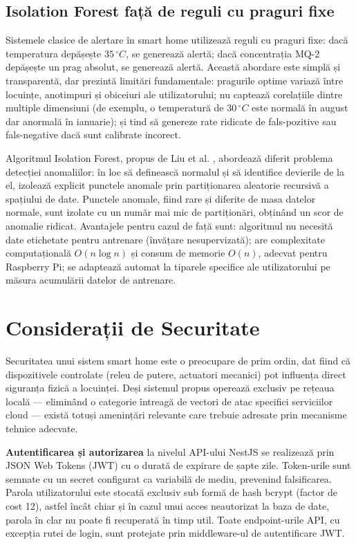 \documentclass[12pt, twoside, a4paper]{report}
\begin{document}
\subsection{Isolation Forest față de reguli cu praguri fixe}

Sistemele clasice de alertare în smart home utilizează reguli cu praguri fixe: dacă
temperatura depășește $35\,^{\circ}C$, se generează alertă; dacă concentrația MQ-2
depășește un prag absolut, se generează alertă. Această abordare este simplă și
transparentă, dar prezintă limitări fundamentale: pragurile optime variază între locuințe,
anotimpuri și obiceiuri ale utilizatorului; nu captează corelațiile dintre multiple
dimensiuni (de exemplu, o temperatură de $30\,^{\circ}C$ este normală în august dar
anormală în ianuarie); și tind să genereze rate ridicate de fals-pozitive sau fals-negative
dacă sunt calibrate incorect.

Algoritmul Isolation Forest, propus de Liu et al. \cite{liu2008},
abordează diferit problema detecției anomaliilor: în loc să definească normalul și să
identifice devierile de la el, izolează explicit punctele anomale prin partiționarea
aleatorie recursivă a spațiului de date. Punctele anomale, fiind rare și diferite de masa
datelor normale, sunt izolate cu un număr mai mic de partiționări, obținând un scor de
anomalie ridicat. Avantajele pentru cazul de față sunt: algoritmul nu necesită date
etichetate pentru antrenare (învățare nesupervizată); are complexitate computațională
$O(n \log n)$ și consum de memorie $O(n)$, adecvat pentru Raspberry Pi; se adaptează
automat la tiparele specifice ale utilizatorului pe măsura acumulării datelor de antrenare.

\section{Considerații de Securitate}

Securitatea unui sistem smart home este o preocupare de prim ordin, dat fiind că
dispozitivele controlate (releu de putere, actuatori mecanici) pot influența direct
siguranța fizică a locuinței. Deși sistemul propus operează exclusiv pe rețeaua locală
--- eliminând o categorie întreagă de vectori de atac specifici serviciilor cloud ---
există totuși amenințări relevante care trebuie adresate prin mecanisme tehnice adecvate.

\textbf{Autentificarea și autorizarea} la nivelul API-ului NestJS se realizează prin
JSON Web Tokens (JWT) cu o durată de expirare de șapte zile. Token-urile sunt semnate
cu un secret configurat ca variabilă de mediu, prevenind falsificarea. Parola
utilizatorului este stocată exclusiv sub formă de hash bcrypt (factor de cost 12),
astfel încât chiar și în cazul unui acces neautorizat la baza de date, parola în clar
nu poate fi recuperată în timp util. Toate endpoint-urile API, cu excepția rutei de
login, sunt protejate prin middleware-ul de autentificare JWT.
\end{document}
